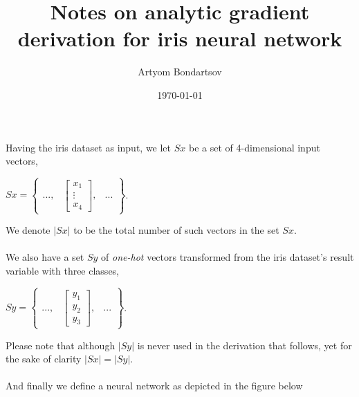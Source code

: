 \documentclass[12pt,titlepage]{article}
\title{Notes on analytic gradient derivation for iris neural network}
\author{Artyom Bondartsov}
\date{\today}
\begin{document}
\maketitle

Having the iris dataset as input, we let $Sx$ be a set of 4-dimensional input vectors,
\begin{center}
$Sx=\begin{Bmatrix}
 ..., & \begin{bmatrix}
x_{1}\\ 
\vdots\\
x_{4} 

\end{bmatrix},&... 
\end{Bmatrix}$.
\end{center}
We denote $|Sx|$ to be the total number of such vectors in the set $Sx$. \\\\
We also have a set $Sy$ of \emph{one-hot} vectors transformed from the iris dataset's result variable with three classes, 
\begin{center}
 $Sy=\begin{Bmatrix}
 ..., & \begin{bmatrix}
y_{1}\\ 
y_{2}\\ 
y_{3} 

\end{bmatrix},&... 
\end{Bmatrix}$.
\end{center}
Please note that although $|Sy|$ is never used in the derivation that follows, yet for the sake of clarity $|Sx|=|Sy|$.\\\\
And finally we define a neural network as depicted in the figure below
    
\end{document}
